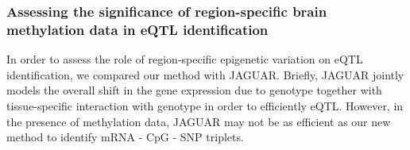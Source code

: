 \documentclass[hidelinks]{article}
\begin{document}
\subsubsection{Assessing the significance of region-specific brain methylation data in eQTL identification}

In order to assess the role of region-specific epigenetic variation on eQTL identification, we compared our method with JAGUAR. Briefly, JAGUAR jointly models the overall shift in the gene expression due to genotype together with tissue-specific interaction with genotype in order to efficiently eQTL. However, in the presence of methylation data, JAGUAR may not be as efficient as our new method to identify mRNA - CpG - SNP triplets. 

%
%
%
\end{document}
